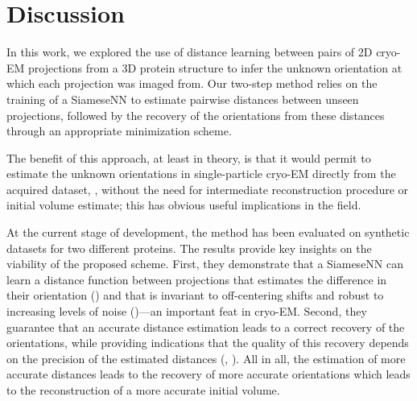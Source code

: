 \section{Discussion}\label{sec:discussion}

In this work, we explored the use of distance learning between pairs of 2D cryo-EM projections from a 3D protein structure to infer the unknown orientation at which each projection was imaged from.
Our two-step method relies on the training of a SiameseNN to estimate pairwise distances between unseen projections, followed by the recovery of the orientations from these distances through an appropriate minimization scheme.

The benefit of this approach, at least in theory, is that it would permit to estimate the unknown orientations in single-particle cryo-EM directly from the acquired dataset, \ie, without the need for intermediate reconstruction procedure or initial volume estimate; this has obvious useful implications in the field.

At the current stage of development, the method has been evaluated on synthetic datasets for two different proteins.
The results provide key insights on the viability of the proposed scheme.
First, they demonstrate that a SiameseNN can learn a distance function between projections that estimates the difference in their orientation () and that is invariant to off-centering shifts and robust to increasing levels of noise ()---an important feat in cryo-EM\@.
Second, they guarantee that an accurate distance estimation leads to a correct recovery of the orientations, while providing indications that the quality of this recovery depends on the precision of the estimated distances (, ).
All in all, the estimation of more accurate distances leads to the recovery of more accurate orientations which leads to the reconstruction of a more accurate initial volume.

